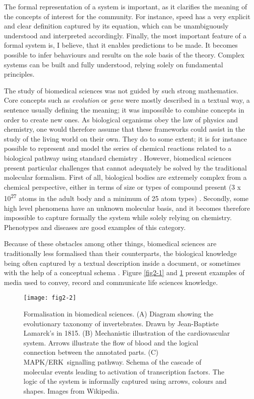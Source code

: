 The formal representation of a system is important, as it clarifies the meaning of the concepts of interest for the community. For instance, speed has a very explicit and clear definition captured by its equation, which can be unambiguously understood and interpreted accordingly. Finally, the most important feature of a formal system is, I believe, that it enables predictions to be made. It becomes possible to infer behaviours and results on the sole basis of the theory. Complex systems can be built and fully understood, relying solely on fundamental principles.

The study of biomedical sciences was not guided by such strong mathematics. Core concepts such as \emph{evolution} or \emph{gene} were mostly described in a textual way, a sentence usually defining the meaning; it was impossible to combine concepts in order to create new ones. As biological organisms obey the law of physics and chemistry, one would therefore assume that these frameworks could assist in the study of the living world on their own. They do to some extent; it is for instance possible to represent and model the series of chemical reactions related to a biological pathway using standard chemistry \citep{le2006biomodels}. However, biomedical sciences present particular challenges that cannot adequately be solved by the traditional molecular formalism. First of all, biological bodies are extremely complex from a chemical perspective, either in terms of size or types of compound present (3 x 10\textsuperscript{27} atoms in the adult body and a minimum of 25 atom types) \citep{nielsen1999ultratrace}. Secondly, some high level phenomena have an unknown molecular basis, and it becomes therefore impossible to capture formally the system while solely relying on chemistry. Phenotypes and diseases are good examples of this category.

Because of these obstacles among other things, biomedical sciences are traditionally less formalised than their counterparts, the biological knowledge being often captured by a textual description inside a document, or sometimes with the help of a conceptual schema \citep{lazebnik2002can}. Figure \ref{fig2-1} and \ref{fig2-2} present examples of media used to convey, record and communicate life sciences knowledge.

\begin{figure}[ht]
    \centering
    \texttt{[image: fig2-2]}
    \caption{Formalisation in biomedical sciences. (A) Diagram showing the evolutionary taxonomy of invertebrates. Drawn by Jean-Baptiste Lamarck's in 1815. (B) Mechanistic illustration of the cardiovascular system. Arrows illustrate the flow of blood and the logical connection between the annotated parts. (C) MAPK/ERK signalling pathway. Schema of the cascade of molecular events leading to activation of transcription factors. The logic of the system is informally captured using arrows, colours and shapes. Images from Wikipedia.}
    \label{fig2-2}
\end{figure}

